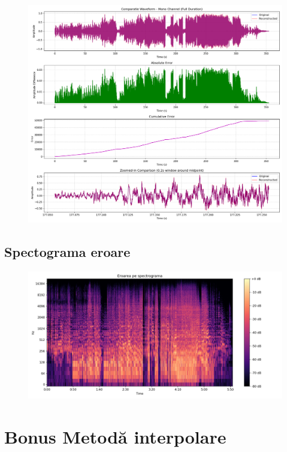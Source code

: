 \documentclass[12pt]{article}
\begin{document}
\begin{figure}[h!]
    \centering
    \includegraphics[width=1\textwidth]{waveform_comparison.png}
\end{figure}

\newpage

\subsection{Spectograma eroare}

\begin{figure}[h!]
    \centering
    \includegraphics[width=1\textwidth]{spectograma_eroare.jpeg}
\end{figure}

\newpage

\section{Bonus Metodă interpolare}
\end{document}
